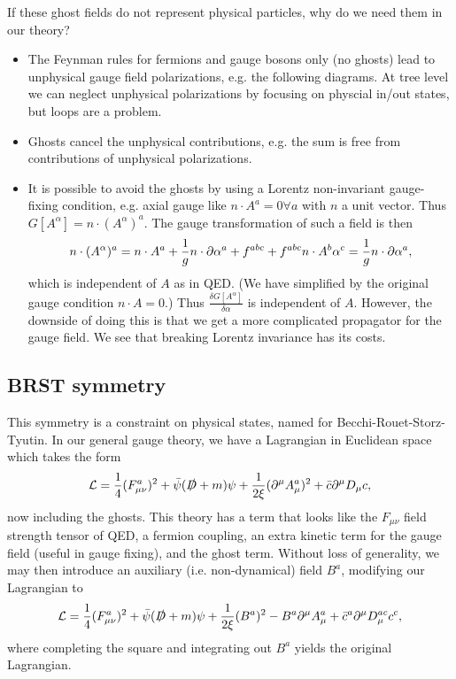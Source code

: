 If these ghost fields do not represent physical particles, why do we need them in our theory?
\begin{itemize}
    \item The Feynman rules for fermions and gauge bosons only (no ghosts) lead to unphysical gauge field polarizations, e.g. the following diagrams.
    At tree level we can neglect unphysical polarizations by focusing on physcial in/out states, but loops are a problem.
    \item Ghosts cancel the unphysical contributions, e.g. the sum
    is free from contributions of unphysical polarizations.
    \item It is possible to avoid the ghosts by using a Lorentz non-invariant gauge-fixing condition, e.g. axial gauge like $n\cdot A^a=0 \forall a$ with $n$ a unit vector. Thus $G[A^\alpha]=n\cdot (A^\alpha)^a$. The gauge transformation of such a field is then
    \begin{equation}
        n\cdot (A^\alpha)^a = n\cdot A^a +\frac{1}{g} n \cdot \partial \alpha^a +f^{abc} +f^{abc} n\cdot A^b \alpha^c =\frac{1}{g} n\cdot \partial \alpha^a,
    \end{equation}
    which is independent of $A$ as in QED. (We have simplified by the original gauge condition $n\cdot A=0$.)  Thus $\frac{\delta G[A^\alpha]}{\delta \alpha}$ is independent of $A$. However, the downside of doing this is that we get a more complicated propagator for the gauge field. We see that breaking Lorentz invariance has its costs.
\end{itemize}

\subsection*{BRST symmetry}
This symmetry is a constraint on physical states, named for Becchi-Rouet-Storz-Tyutin. In our general gauge theory, we have a Lagrangian in Euclidean space which takes the form
\begin{equation}
    \mathcal L=\frac{1}{4}(F^a_{\mu\nu})^2 +\bar \psi(\slashed{D}+m)\psi +\frac{1}{2\xi}(\partial^\mu A^a_\mu)^2 + \bar c \partial^\mu D_\mu c,
\end{equation}
now including the ghosts. This theory has a term that looks like the $F_{\mu\nu}$ field strength tensor of QED, a fermion coupling, an extra kinetic term for the gauge field (useful in gauge fixing), and the ghost term.
Without loss of generality, we may then introduce an auxiliary (i.e. non-dynamical) field $B^a$, modifying our Lagrangian to
\begin{equation}
    \mathcal L = \frac{1}{4}(F_{\mu\nu}^a)^2 + \bar \psi(\slashed{D} + m) \psi +\frac{1}{2\xi} (B^a)^2 -B^a \partial^\mu A_\mu^a  +\bar c^a \partial^\mu D_\mu^{ac} c^c,
\end{equation}
where completing the square and integrating out $B^a$ yields the original Lagrangian.

